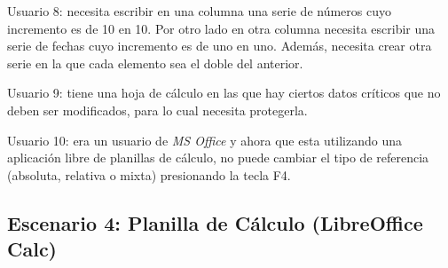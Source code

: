 \documentclass[12pt]{article}
\begin{document}
\begin{description}
    \item{Usuario 8}: necesita escribir en una columna una serie de números
    cuyo incremento es de 10 en 10. Por otro lado en otra columna necesita
    escribir una serie de fechas cuyo incremento es de uno en uno. Además,
    necesita crear otra serie en la que cada elemento sea el doble del
    anterior.

    \item{Usuario 9}: tiene una hoja de cálculo en las que hay ciertos datos
    críticos que no deben ser modificados, para lo cual necesita protegerla.

    \item{Usuario 10}: era un usuario de \emph{MS Office} y ahora que esta utilizando
    una aplicación libre de planillas de cálculo, no puede cambiar el tipo de
    referencia (absoluta, relativa o mixta) presionando la tecla F4.

\end{description}

\subsection*{Escenario 4: Planilla de Cálculo (LibreOffice Calc)}
\end{document}
